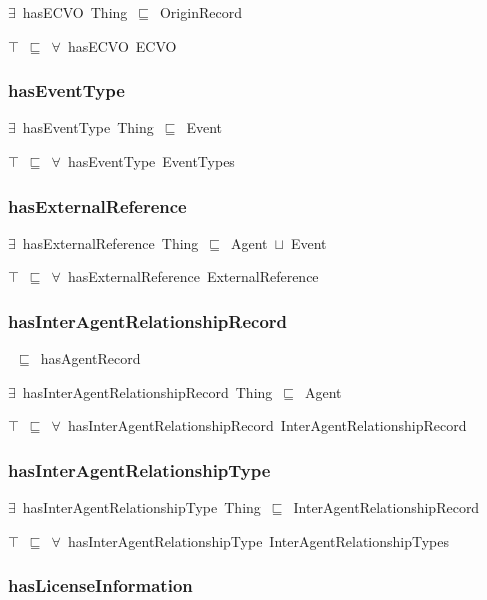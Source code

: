 \documentclass{article}
\begin{document}
\ensuremath{\exists}~hasECVO~Thing~\ensuremath{\sqsubseteq}~OriginRecord

\ensuremath{\top}~\ensuremath{\sqsubseteq}~\ensuremath{\forall}~hasECVO~ECVO

\subsubsection*{hasEventType}

\ensuremath{\exists}~hasEventType~Thing~\ensuremath{\sqsubseteq}~Event

\ensuremath{\top}~\ensuremath{\sqsubseteq}~\ensuremath{\forall}~hasEventType~EventTypes

\subsubsection*{hasExternalReference}

\ensuremath{\exists}~hasExternalReference~Thing~\ensuremath{\sqsubseteq}~Agent~\ensuremath{\sqcup}~Event

\ensuremath{\top}~\ensuremath{\sqsubseteq}~\ensuremath{\forall}~hasExternalReference~ExternalReference

\subsubsection*{hasInterAgentRelationshipRecord}

~\ensuremath{\sqsubseteq}~hasAgentRecord

\ensuremath{\exists}~hasInterAgentRelationshipRecord~Thing~\ensuremath{\sqsubseteq}~Agent

\ensuremath{\top}~\ensuremath{\sqsubseteq}~\ensuremath{\forall}~hasInterAgentRelationshipRecord~InterAgentRelationshipRecord

\subsubsection*{hasInterAgentRelationshipType}

\ensuremath{\exists}~hasInterAgentRelationshipType~Thing~\ensuremath{\sqsubseteq}~InterAgentRelationshipRecord

\ensuremath{\top}~\ensuremath{\sqsubseteq}~\ensuremath{\forall}~hasInterAgentRelationshipType~InterAgentRelationshipTypes

\subsubsection*{hasLicenseInformation}
\end{document}
